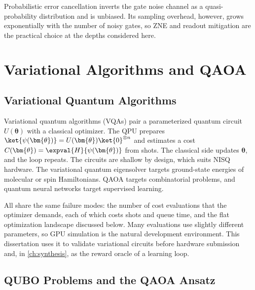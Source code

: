 Probabilistic error cancellation \cite{temme2017errormitigation} inverts the gate noise channel as a quasi-probability distribution and is unbiased. Its sampling overhead, however, grows exponentially with the number of noisy gates, so ZNE and readout mitigation are the practical choice at the depths considered here.

\section{Variational Algorithms and QAOA}\label{sec:bg:vqa}

\subsection{Variational Quantum Algorithms}

Variational quantum algorithms (VQAs) \cite{cerezo2021vqa} pair a parameterized quantum circuit $U(\bm{\theta})$ with a classical optimizer. The QPU prepares $\ket{\psi(\bm{\theta})}=U(\bm{\theta})\ket{0}^{\otimes n}$ and estimates a cost $C(\bm{\theta})=\expval{H}{\psi(\bm{\theta})}$ from shots. The classical side updates $\bm{\theta}$, and the loop repeats. The circuits are shallow by design, which suits NISQ hardware. The variational quantum eigensolver targets ground-state energies of molecular or spin Hamiltonians. QAOA targets combinatorial problems, and quantum neural networks target supervised learning.

All share the same failure modes: the number of cost evaluations that the optimizer demands, each of which costs shots and queue time, and the flat optimization landscape discussed below. Many evaluations use slightly different parameters, so GPU simulation is the natural development environment. This dissertation uses it to validate variational circuits before hardware submission and, in \cref{ch:synthesis}, as the reward oracle of a learning loop.

\subsection{QUBO Problems and the QAOA Ansatz}

